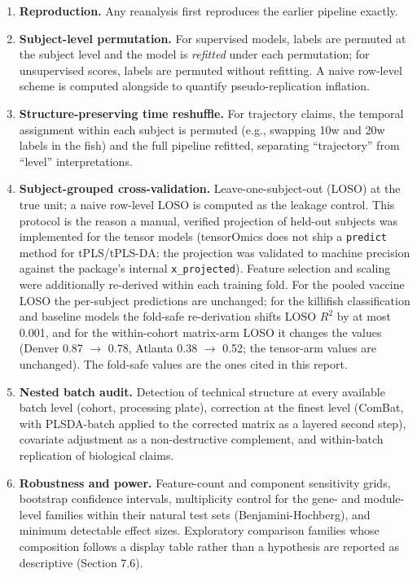 \documentclass[
]{article}
\providecommand{\tightlist}{%
  \setlength{\itemsep}{0pt}\setlength{\parskip}{0pt}}
\begin{document}
\begin{enumerate}
\def\labelenumi{\arabic{enumi}.}
\tightlist
\item
  \textbf{Reproduction.} Any reanalysis first reproduces the earlier
  pipeline exactly.
\item
  \textbf{Subject-level permutation.} For supervised models, labels are
  permuted at the subject level and the model is \emph{refitted} under
  each permutation; for unsupervised scores, labels are permuted without
  refitting. A naive row-level scheme is computed alongside to quantify
  pseudo-replication inflation.
\item
  \textbf{Structure-preserving time reshuffle.} For trajectory claims,
  the temporal assignment within each subject is permuted (e.g.,
  swapping 10w and 20w labels in the fish) and the full pipeline
  refitted, separating ``trajectory'' from ``level'' interpretations.
\item
  \textbf{Subject-grouped cross-validation.} Leave-one-subject-out
  (LOSO) at the true unit; a naive row-level LOSO is computed as the
  leakage control. This protocol is the reason a manual, verified
  projection of held-out subjects was implemented for the tensor models
  (tensorOmics does not ship a \texttt{predict} method for tPLS/tPLS-DA;
  the projection was validated to machine precision against the
  package's internal \texttt{x\_projected}). Feature selection and
  scaling were additionally re-derived within each training fold. For
  the pooled vaccine LOSO the per-subject predictions are unchanged; for
  the killifish classification and baseline models the fold-safe
  re-derivation shifts LOSO \(R^2\) by at most 0.001, and for the
  within-cohort matrix-arm LOSO it changes the values (Denver 0.87
  \(\to\) 0.78, Atlanta 0.38 \(\to\) 0.52; the tensor-arm values are
  unchanged). The fold-safe values are the ones cited in this report.
\item
  \textbf{Nested batch audit.} Detection of technical structure at every
  available batch level (cohort, processing plate), correction at the
  finest level (ComBat, with PLSDA-batch applied to the corrected matrix
  as a layered second step), covariate adjustment as a non-destructive
  complement, and within-batch replication of biological claims.
\item
  \textbf{Robustness and power.} Feature-count and component sensitivity
  grids, bootstrap confidence intervals, multiplicity control for the
  gene- and module-level families within their natural test sets
  (Benjamini-Hochberg), and minimum detectable effect sizes. Exploratory
  comparison families whose composition follows a display table rather
  than a hypothesis are reported as descriptive (Section 7.6).
\end{enumerate}
\end{document}
